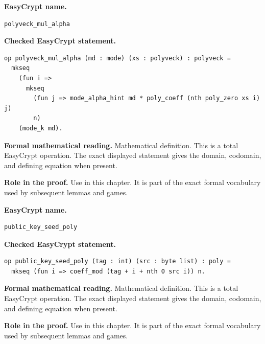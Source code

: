 \begin{formaldefinition}
\noindent\textbf{EasyCrypt name.}
\begin{lstlisting}[language=EasyCrypt,basicstyle=\ttfamily\scriptsize]
polyveck_mul_alpha
\end{lstlisting}
\noindent\textbf{Checked EasyCrypt statement.}
\begin{lstlisting}[language=EasyCrypt,basicstyle=\ttfamily\scriptsize]
op polyveck_mul_alpha (md : mode) (xs : polyveck) : polyveck =
  mkseq
    (fun i =>
      mkseq
        (fun j => mode_alpha_hint md * poly_coeff (nth poly_zero xs i) j)
        n)
    (mode_k md).
\end{lstlisting}
\noindent\textbf{Formal mathematical reading.}
Mathematical definition. This is a total EasyCrypt operation.  The exact displayed statement gives the domain, codomain, and defining equation when present.

\noindent\textbf{Role in the proof.}
Use in this chapter. It is part of the exact formal vocabulary used by subsequent lemmas and games.

\end{formaldefinition}

\begin{formaldefinition}
\noindent\textbf{EasyCrypt name.}
\begin{lstlisting}[language=EasyCrypt,basicstyle=\ttfamily\scriptsize]
public_key_seed_poly
\end{lstlisting}
\noindent\textbf{Checked EasyCrypt statement.}
\begin{lstlisting}[language=EasyCrypt,basicstyle=\ttfamily\scriptsize]
op public_key_seed_poly (tag : int) (src : byte list) : poly =
  mkseq (fun i => coeff_mod (tag + i + nth 0 src i)) n.
\end{lstlisting}
\noindent\textbf{Formal mathematical reading.}
Mathematical definition. This is a total EasyCrypt operation.  The exact displayed statement gives the domain, codomain, and defining equation when present.

\noindent\textbf{Role in the proof.}
Use in this chapter. It is part of the exact formal vocabulary used by subsequent lemmas and games.

\end{formaldefinition}

